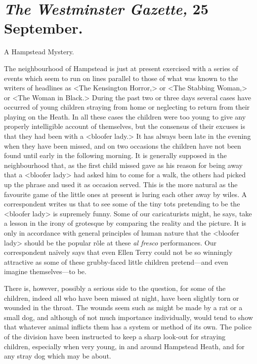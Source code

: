 \begin{letter}
	\clearpage
\end{letter}

\section{\emph{The Westminster Gazette,} 25 September.}

\begin{newspaper}{A Hampstead Mystery.}

The neighbourhood of Hampstead is just at present exercised with a series of events which seem to run on lines parallel to those of what was known to the writers of headlines as <The Kensington Horror,> or <The Stabbing Woman,> or <The Woman in Black.> During the past two or three days several cases have occurred of young children straying from home or neglecting to return from their playing on the Heath. In all these cases the children were too young to give any properly intelligible account of themselves, but the consensus of their excuses is that they had been with a <bloofer lady.> It has always been late in the evening when they have been missed, and on two occasions the children have not been found until early in the following morning. It is generally supposed in the neighbourhood that, as the first child missed gave as his reason for being away that a <bloofer lady> had asked him to come for a walk, the others had picked up the phrase and used it as occasion served. This is the more natural as the favourite game of the little ones at present is luring each other away by wiles. A correspondent writes us that to see some of the tiny tots pretending to be the <bloofer lady> is supremely funny. Some of our caricaturists might, he says, take a lesson in the irony of grotesque by comparing the reality and the picture. It is only in accordance with general principles of human nature that the <bloofer lady> should be the popular rôle at these \textit{al fresco} performances. Our correspondent naïvely says that even Ellen Terry could not be so winningly attractive as some of these grubby-faced little children pretend—and even imagine themselves—to be.

There is, however, possibly a serious side to the question, for some of the children, indeed all who have been missed at night, have been slightly torn or wounded in the throat. The wounds seem such as might be made by a rat or a small dog, and although of not much importance individually, would tend to show that whatever animal inflicts them has a system or method of its own. The police of the division have been instructed to keep a sharp look-out for straying children, especially when very young, in and around Hampstead Heath, and for any stray dog which may be about.
\end{newspaper}

